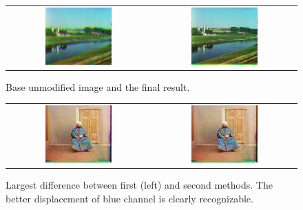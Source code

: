 \begin{figure}[h]
	\centering
	\begin{tabular}{cc}
	\includegraphics[width=0.48\textwidth]{figures/00125_base.png} &
	\includegraphics[width=0.48\textwidth]{figures/00125_v2.png} 

	\end{tabular}
	\caption{Base unmodified image and the final result. }
	\label{fig:a1:alignment}
\end{figure}

\begin{figure}[h]
	\centering
	\begin{tabular}{cc}
	\includegraphics[width=0.48\textwidth]{figures/00153_v1.png} &
	\includegraphics[width=0.48\textwidth]{figures/00153_v2.png} 

	\end{tabular}
	\caption{Largest difference between first (left) and second methods. The better displacement of blue channel is clearly recognizable. }
	\label{fig:a1:difference_v1_v2}
\end{figure}

